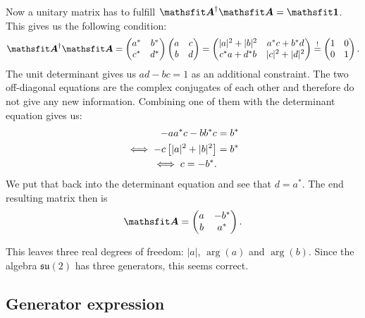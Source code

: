 \documentclass[11pt, english, fleqn, DIV=15, headinclude, BCOR=1cm]{scrartcl}
\begin{document}
Now a unitary matrix has to fulfill $\tens A^\dagger \tens A = \tens 1$. This
gives us the following condition:
\[
    \tens A^\dagger \tens A
    =
    \begin{pmatrix}
        a^* & b^* \\ c^* & d^*
    \end{pmatrix}
    \begin{pmatrix}
        a & c \\ b & d
    \end{pmatrix}
    =
    \begin{pmatrix}
        |a|^2 + |b|^2 & a^*c + b^*d \\
        c ^*a + d^*b & |c|^2 + |d|^2
    \end{pmatrix}
    \overset !=
    \begin{pmatrix}
        1 & 0 \\ 0 & 1
    \end{pmatrix}.
\]
The unit determinant gives us $ad-bc=1$ as an additional constraint. The two
off-diagonal equations are the complex conjugates of each other and therefore
do not give any new information. Combining one of them with the determinant
equation gives us:
\begin{align*}
    - aa^*c - bb^*c &= b^* \\
    \iff -c \left[ |a|^2 + |b|^2 \right] &= b^* \\
    \iff c = - b^*.
\end{align*}
We put that back into the determinant equation and see that $d = a^*$. The end
resulting matrix then is
\[
    \tens A = \begin{pmatrix}
        a & -b^* \\ b & a^*
    \end{pmatrix}.
\]

This leaves three real degrees of freedom: $|a|$, $\arg(a)$ and $\arg(b)$.
Since the algebra $\mathfrak{su}(2)$ has three generators, this seems correct.

\subsection{Generator expression}
\end{document}
